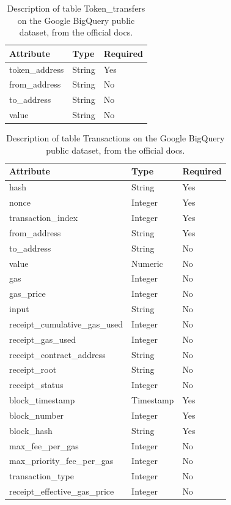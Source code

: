 \begin{table}[H]
\centering
    \begin{tabular}  { m{6cm} m{3cm} m{3cm} } 
    \toprule
    \textbf{Attribute} & \textbf{Type} & \textbf{Required} \\
    \midrule
    token\_address & String & Yes	 \\			
    from\_address & String & No \\
    to\_address & String	& No	\\			
    value & String	& No	\\
    \bottomrule
\end{tabular}
\caption[Google BigQuery \texttt{Token\_transfers} table]{Description of table Token\_transfers on the Google BigQuery public dataset, from the official docs.}
\label{table:bigquery-transfers}
\end{table}

\begin{table}[H]
\centering
    \begin{tabular}  { m{6cm} m{3cm} m{3cm} } 
    \toprule
    \textbf{Attribute} & \textbf{Type} & \textbf{Required} \\
    \midrule
    hash & String	& Yes		\\		
    nonce & Integer	& Yes \\				
    transaction\_index & Integer	& Yes		\\		
    from\_address & String	& Yes			\\	
    to\_address & String	& No		\\		
    value & Numeric	& No \\				
    gas &  Integer	& No \\				 
    gas\_price &  Integer &	No \\				
    input &  String	& No \\				
    receipt\_cumulative\_gas\_used & Integer & 	No \\				
    receipt\_gas\_used  & Integer	& No \\				
    receipt\_contract\_address & String	& No \\				
    receipt\_root &  String & 	No \\				
    receipt\_status  & Integer & 	No \\				
    block\_timestamp  & Timestamp	 & Yes \\				
    block\_number  & Integer & 	Yes \\				
    block\_hash & String &	Yes \\				
    max\_fee\_per\_gas & Integer	& No \\	
    max\_priority\_fee\_per\_gas & Integer	& No \\		
    transaction\_type & Integer	& No				\\
    receipt\_effective\_gas\_price & Integer	& No	\\
    \bottomrule
\end{tabular}
\caption[Google BigQuery \texttt{Transactions} table]{Description of table Transactions on the Google BigQuery public dataset, from the official docs.}
\label{table:bigquery-transactions}
\end{table}

